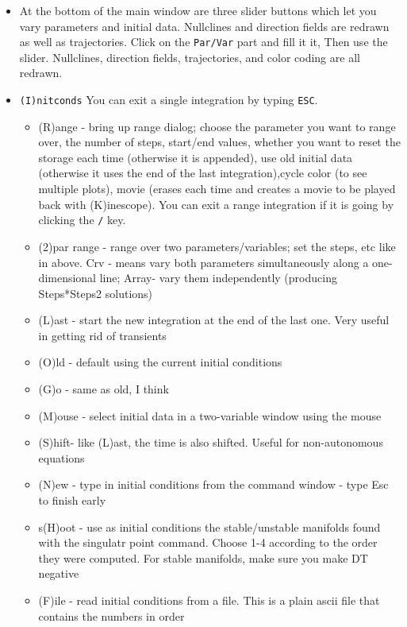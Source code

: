 \documentclass{article}
\begin{document}
\begin{itemize}
\begin{itemize}
\end{itemize}      
\item At the bottom of the main window are three slider buttons which let you vary parameters and initial data. Nullclines and direction fields are redrawn as well as trajectories. Click on the {\tt Par/Var} part and fill it it, Then use the slider. Nullclines, direction fields, trajectories, and color coding are all redrawn.
\end{itemize}

\bigskip
{}
\begin{itemize}
\item {\tt (I)nitconds}  You can exit a single integration by typing {\tt ESC}. 
\begin{itemize} 
\item (R)ange - bring up range dialog; choose the parameter you want to range over, the number of steps, start/end values, whether you want to reset the storage each time (otherwise it is appended), use old initial data (otherwise it uses the end of the last integration),cycle color (to see multiple plots), movie (erases each time and creates a movie to be played back with (K)inescope). You can exit a range integration if it is going by clicking the {\tt /} key.
\item (2)par range - range over two parameters/variables; set the steps, etc like in above. Crv - means vary both parameters simultaneously along a one-dimensional line; Array- vary them independently (producing Steps*Steps2 solutions)
\item (L)ast - start the new integration at the end of the last one. Very useful in getting rid of transients
\item (O)ld - default using the current initial conditions
\item (G)o - same as old, I think
\item (M)ouse - select initial data in a two-variable window using the mouse
\item (S)hift- like (L)ast, the time is also shifted. Useful for non-autonomous equations
\item (N)ew - type in initial conditions from the command window - type Esc to finish early
\item s(H)oot - use as initial conditions the stable/unstable manifolds found with the singulatr point command. Choose 1-4 according to the order they were computed. For stable manifolds, make sure you make DT negative
\item (F)ile - read initial conditions from a file. This is a plain ascii file that contains the numbers in order

\end{itemize}
\end{itemize}
\end{document}
